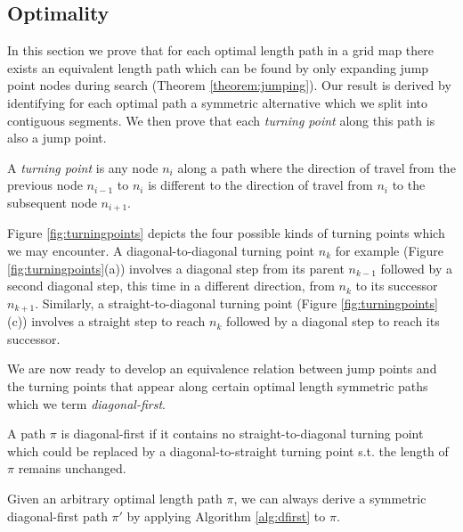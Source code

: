 \subsection{Optimality}
In this section we prove that for each optimal length path in a grid map there
exists an equivalent length path which can be found by only expanding jump
point nodes during search (Theorem \ref{theorem:jumping}).  Our result is
derived by identifying for each optimal path a symmetric alternative which we
split into contiguous segments. We then prove that each \emph{turning point}
along this path is also a jump point.

\begin{definition}
\label{def:turningpoint}
A \emph{turning point} is any node $n_{i}$ along a path where the direction of
travel from the previous node $n_{i-1}$ to $n_{i}$ is different to the direction
of travel from $n_{i}$ to the subsequent node $n_{i+1}$.
\end{definition}

Figure \ref{fig:turningpoints} depicts the four possible
kinds of turning points which we may encounter. 
A diagonal-to-diagonal turning point $n_{k}$ for example (Figure
\ref{fig:turningpoints}(a)) involves a diagonal step from its parent $n_{k-1}$ 
followed by a second diagonal step, this time in a different direction,
from $n_{k}$ to its successor $n_{k+1}$.
Similarly, a straight-to-diagonal turning point (Figure
\ref{fig:turningpoints}(c)) 
involves a straight step to reach $n_{k}$ followed by a diagonal step to reach its 
successor. 

We are now ready to develop an equivalence relation between
jump points and the turning points that appear along certain optimal length 
symmetric paths which we term \emph{diagonal-first}.
 
\begin{definition}
A path $\pi$ is diagonal-first if it contains no straight-to-diagonal turning point
which could be replaced by a diagonal-to-straight turning point s.t.
the length of $\pi$ remains unchanged.
\end{definition}

Given an arbitrary optimal length path $\pi$, we can always derive a symmetric
diagonal-first path $\pi'$ by applying Algorithm \ref{alg:dfirst} to $\pi$.



